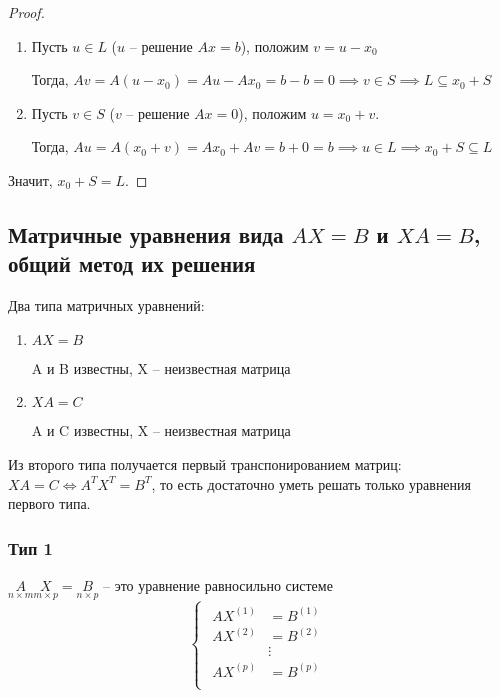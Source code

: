 \begin{proof}~
    \begin{enumerate}
    \item
        Пусть $u \in L$ ($u$ -- решение $Ax = b$), положим $v = u - x_0$

        Тогда, $Av = A(u - x_0) = Au - Ax_0 = b - b = 0 \implies v \in S \implies L \subseteq x_0 + S$

    \item
        Пусть $v \in S$ ($v$ -- решение $Ax = 0$), положим $u = x_0 + v$.

        Тогда, $Au = A(x_0 + v) = Ax_0 + Av = b + 0 = b \implies u \in L \implies x_0 + S \subseteq L$
    \end{enumerate}

    Значит, $x_0 + S = L$.
\end{proof}


\subsection{Матричные уравнения вида $AX = B$ и $XA = B$, общий метод их решения}

Два типа матричных уравнений:
\begin{enumerate}
\item $AX = B$

    A и B известны,
    X -- неизвестная матрица

\item $XA = C$

    A и C известны,
    X -- неизвестная матрица
\end{enumerate}

Из второго типа получается первый транспонированием матриц: $XA = C \iff A^T X^T = B^T$, то есть достаточно уметь решать только уравнения первого типа.


\subsubsection{Тип 1}

$\underset{n \times m}{A} \underset{m \times p}{X} = \underset{n \times p}{B}$ -- это уравнение равносильно системе
\begin{equation*}
    \begin{cases}
        \begin{aligned}
            AX^{(1)} &= B^{(1)} \\
            AX^{(2)} &= B^{(2)} \\
            &\vdots \\
            AX^{(p)} &= B^{(p)} \\
        \end{aligned}
    \end{cases}
\end{equation*}

